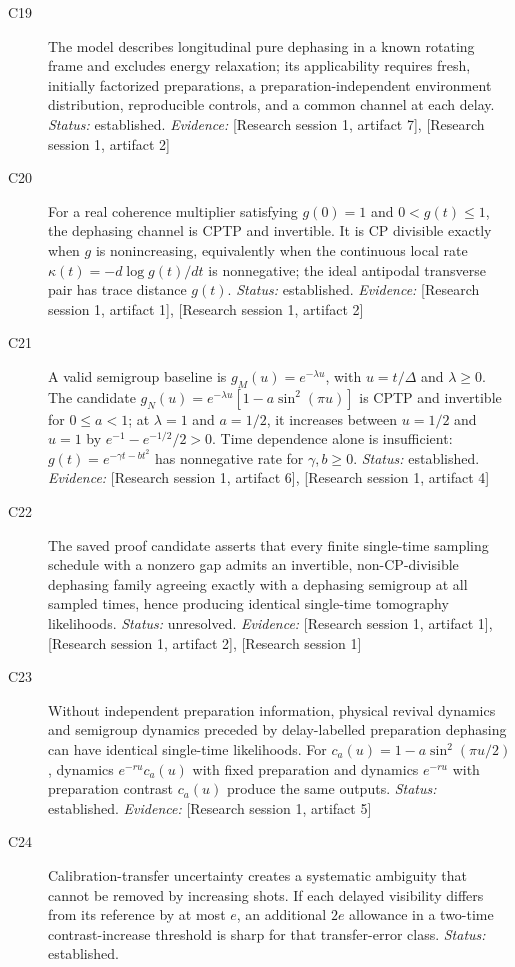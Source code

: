 \documentclass[11pt]{article}
\begin{document}
\begin{sloppypar}
\small
\begin{description}
\item[C19] The model describes longitudinal pure dephasing in a known rotating frame and excludes energy relaxation; its applicability requires fresh, initially factorized preparations, a preparation-independent environment distribution, reproducible controls, and a common channel at each delay. \textit{Status: }established.
\textit{Evidence: }[Research session 1, artifact 7], [Research session 1, artifact 2]
\item[C20] For a real coherence multiplier satisfying $g(0)=1$ and $0<g(t)\leq1$, the dephasing channel is CPTP and invertible. It is CP divisible exactly when $g$ is nonincreasing, equivalently when the continuous local rate $\kappa(t)=-d\log g(t)/dt$ is nonnegative; the ideal antipodal transverse pair has trace distance $g(t)$. \textit{Status: }established.
\textit{Evidence: }[Research session 1, artifact 1], [Research session 1, artifact 2]
\item[C21] A valid semigroup baseline is $g_M(u)=e^{-\lambda u}$, with $u=t/\Delta$ and $\lambda\geq0$. The candidate $g_N(u)=e^{-\lambda u}[1-a\sin^2(\pi u)]$ is CPTP and invertible for $0\leq a<1$; at $\lambda=1$ and $a=1/2$, it increases between $u=1/2$ and $u=1$ by $e^{-1}-e^{-1/2}/2>0$. Time dependence alone is insufficient: $g(t)=e^{-\gamma t-bt^2}$ has nonnegative rate for $\gamma,b\geq0$. \textit{Status: }established.
\textit{Evidence: }[Research session 1, artifact 6], [Research session 1, artifact 4]
\item[C22] The saved proof candidate asserts that every finite single-time sampling schedule with a nonzero gap admits an invertible, non-CP-divisible dephasing family agreeing exactly with a dephasing semigroup at all sampled times, hence producing identical single-time tomography likelihoods. \textit{Status: }unresolved.
\textit{Evidence: }[Research session 1, artifact 1], [Research session 1, artifact 2], [Research session 1]
\item[C23] Without independent preparation information, physical revival dynamics and semigroup dynamics preceded by delay-labelled preparation dephasing can have identical single-time likelihoods. For $c_a(u)=1-a\sin^2(\pi u/2)$, dynamics $e^{-ru}c_a(u)$ with fixed preparation and dynamics $e^{-ru}$ with preparation contrast $c_a(u)$ produce the same outputs. \textit{Status: }established.
\textit{Evidence: }[Research session 1, artifact 5]
\item[C24] Calibration-transfer uncertainty creates a systematic ambiguity that cannot be removed by increasing shots. If each delayed visibility differs from its reference by at most $e$, an additional $2e$ allowance in a two-time contrast-increase threshold is sharp for that transfer-error class. \textit{Status: }established.

\end{description}
\end{sloppypar}
\end{document}
